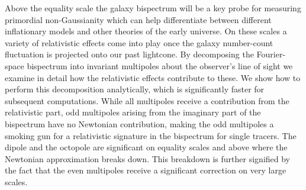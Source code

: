 

Above the equality scale the galaxy bispectrum will be  a key probe for measuring primordial non-Gaussianity which can help differentiate between different inflationary models and other theories of the early universe. On these scales a variety of relativistic effects come into play once the galaxy number-count fluctuation is projected onto our past lightcone. By decomposing the Fourier-space bispectrum into invariant multipoles about the observer's line of sight we examine in detail how the relativistic effects contribute to these. We show how to perform this decomposition analytically, which is significantly faster for subsequent computations.  While all multipoles receive a contribution from the relativistic part, odd multipoles arising from the imaginary part of the bispectrum have no Newtonian contribution, making the odd multipoles a smoking gun for a relativistic signature in the bispectrum for single tracers.  The dipole and the octopole are significant on equality scales and above where the Newtonian approximation breaks down. This breakdown is further signified by the fact that the even multipoles receive a significant correction on very large scales.


